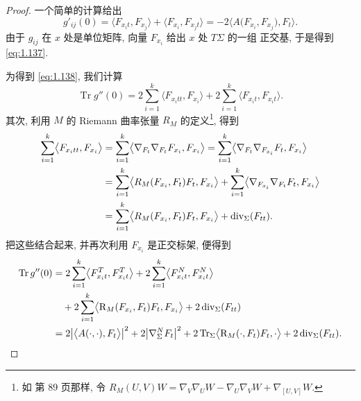 \begin{proof}
一个简单的计算给出
\begin{equation}
g'_{ij}(0)
 =\bigl\langle F_{x_it},F_{x_j}\bigr\rangle
 +\bigl\langle F_{x_i},F_{x_jt}\bigr\rangle
 =-2\bigl\langle A\bigl(F_{x_i},F_{x_j}\bigr),F_t\bigr\rangle.
\label{eq:1.139}
\end{equation}
由于 $g_{ij}$ 在 $x$ 处是单位矩阵, 向量 $F_{x_i}$ 给出 $x$ 处 $T\Sigma$ 的一组
正交基, 于是得到 \eqref{eq:1.137}.

为得到 \eqref{eq:1.138}, 我们计算
\begin{equation}
\operatorname{Tr}g''(0)
 =2\sum_{i=1}^{k}\bigl\langle F_{x_itt},F_{x_i}\bigr\rangle
 +2\sum_{i=1}^{k}\bigl\langle F_{x_it},F_{x_it}\bigr\rangle.
\label{eq:1.140}
\end{equation}
其次, 利用 $M$ 的 Riemann 曲率张量 $R_M$ 的定义\footnote{如 \cite{dC2} 第
89 页那样, 令
$R_M(U,V)W=\nabla_V\nabla_UW-\nabla_U\nabla_VW+\nabla_{[U,V]}W$.}, 得到
\begin{equation}
\begin{aligned}
\sum_{i=1}^{k}\bigl\langle F_{x_itt},F_{x_i}\bigr\rangle
&=\sum_{i=1}^{k}\bigl\langle\nabla_{F_t}\nabla_{F_t}F_{x_i},F_{x_i}\bigr\rangle
 =\sum_{i=1}^{k}\bigl\langle\nabla_{F_t}\nabla_{F_{x_i}}F_t,F_{x_i}\bigr\rangle\\
&=\sum_{i=1}^{k}\bigl\langle R_M(F_{x_i},F_t)F_t,F_{x_i}\bigr\rangle
 +\sum_{i=1}^{k}\bigl\langle\nabla_{F_{x_i}}\nabla_{F_t}F_t,F_{x_i}\bigr\rangle\\
&=\sum_{i=1}^{k}\bigl\langle R_M(F_{x_i},F_t)F_t,F_{x_i}\bigr\rangle
 +\operatorname{div}_{\Sigma}(F_{tt}).
\end{aligned}
\label{eq:1.141}
\end{equation}
把这些结合起来, 并再次利用 $F_{x_i}$ 是正交标架, 便得到
\begin{equation*}
\begin{aligned}
\operatorname{Tr}g''(0)
&=2\sum_{i=1}^{k}\bigl\langle F_{x_it}^{T},F_{x_it}^{T}\bigr\rangle
 +2\sum_{i=1}^{k}\bigl\langle F_{x_it}^{N},F_{x_it}^{N}\bigr\rangle\\
&\quad+2\sum_{i=1}^{k}\bigl\langle \mathrm{R}_M(F_{x_i},F_t)F_t,F_{x_i}\bigr\rangle
 +2\operatorname{div}_{\Sigma}(F_{tt})\\
&=2\bigl|\bigl\langle A(\cdot,\cdot),F_t\bigr\rangle\bigr|^{2}
 +2\bigl|\nabla_{\Sigma}^{N}F_t\bigr|^{2}
 +2\operatorname{Tr}_{\Sigma}
 \bigl\langle \mathrm{R}_M(\cdot,F_t)F_t,\cdot\bigr\rangle
 +2\operatorname{div}_{\Sigma}(F_{tt}).
\end{aligned}
\end{equation*}

\end{proof}
